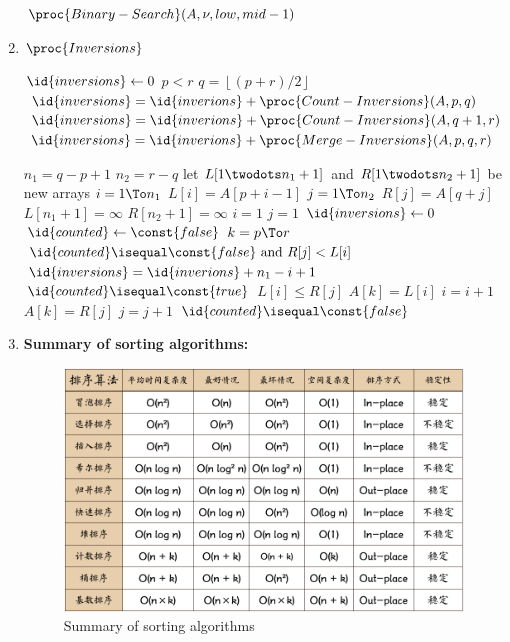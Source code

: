 \documentclass{report}
\newcommand{\floor}[1]{\left\lfloor #1 \right\rfloor}
\begin{document}
\begin{enumerate}
\begin{codebox}
    \li \Else \Return $\proc{Binary-Search}(A, \nu, low, mid-1)$
        \End
    \end{codebox}
    \item $\proc{Inversions}$
    \begin{codebox}
     \label{alg:count-inversions}
    \li $\id{inversions} \gets 0$
    \li \If $p < r$
        \Then 
    \li     $q = \floor{(p+r)/2}$
    \li     $\id{inversions} = \id{inverions} + \proc{Count-Inversions}(A,p,q)$
    \li     $\id{inversions} = \id{inverions} + \proc{Count-Inversions}(A,q+1,r)$
    \li     $\id{inversions} = \id{inverions} + \proc{Merge-Inversions}(A,p,q,r)$
        \End
    \li \Return {}
    \end{codebox}
    \begin{codebox}
    \li $n_1 = q-p+1$
    \li $n_2 = r-q$
    \li let $L[1 \twodots n_1 + 1]$ and $R[1 \twodots n_2 + 1]$ be new arrays 
    \li \For $i = 1 \To n_1$
        \Do 
    \li     $L[i] = A[p+i-1]$
        \End 
    \li \For $j = 1 \To n_2$ 
        \Do 
    \li     $R[j] = A[q+j]$
        \End 
    \li $L[n_1 + 1] = \infty$ 
    \li $R[n_2 + 1] = \infty$
    \li $i = 1$
    \li $j = 1$
    \li $\id{inversions} \gets 0$
    \li $\id{counted} \gets \const{false}$
    \li \For $k = p \To r$
        \Do
    \li     \If $\id{counted} \isequal \const{false} \text{ and } R[j] < L[i]$
            \Then
    \li         $\id{inversions} = \id{inverions} + n_1 - i + 1$
    \li         $\id{counted} \isequal \const{true}$
            \End
    \li     \If $L[i] \leq R[j]$
            \Then 
    \li         $A[k] = L[i]$
    \li         $i = i+1$
    \li     \Else $A[k] = R[j]$
    \li         $j = j+1$
    \li         $\id{counted} \isequal \const{false}$
            \End
        \End
    \end{codebox}
    \item \textbf{Summary of sorting algorithms:}
    \begin{figure}[h]
        \centering
        \includegraphics[scale=0.3]{figures/sort_algo_summary.png}
        \caption{Summary of sorting algorithms}
        \label{fig:sort_algo_summary}
    \end{figure}
\end{enumerate}
\end{document}
